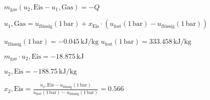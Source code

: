 \( m_{\text{gas}} (u_2, \text{Eis} - u_1, \text{Gas}) = -Q \)  

\( u_1, \text{Gas} = u_{\text{flüssig}} (1 \, \text{bar}) + x_{\text{Eis}} \cdot (u_{\text{fest}} (1 \, \text{bar}) - u_{\text{flüssig}} (1 \, \text{bar})) \)  

\( u_{\text{flüssig}} (1 \, \text{bar}) = -0.045 \, \text{kJ/kg} \)  
\( u_{\text{fest}} (1 \, \text{bar}) = 333.458 \, \text{kJ/kg} \)  

\( m_{\text{gas}} \cdot u_2, \text{Eis} = -18.875 \, \text{kJ} \)  

\( u_2, \text{Eis} = -188.75 \, \text{kJ/kg} \)  

\( x_2, \text{Eis} = \frac{u_2, \text{Eis} - u_{\text{flüssig}} (1 \, \text{bar})}{u_{\text{fest}} (1 \, \text{bar}) - u_{\text{flüssig}} (1 \, \text{bar})} = 0.566 \)